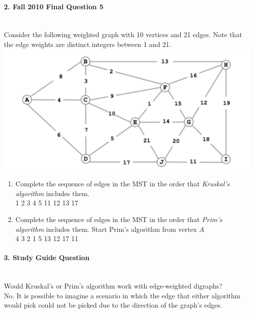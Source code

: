 \documentclass{article}
\begin{document}
\paragraph{\Large 2. Fall 2010 Final Question 5}\mbox{}\\
Consider the following weighted graph with 10 vertices and 21 edges. Note that the edge weights are distinct integers between 1 and 21.\\
\includegraphics[]{fin-f08-2.png}\\
\begin{enumerate}
\renewcommand{\theenumi}{\Alph{enumi}}
	\item Complete the sequence of edges in the MST in the order that \textit{Kruskal's algorithm} includes them.\\

	1 2 3 4 5 11 12 13 17

	\item Complete the sequence of edges in the MST in the order that \textit{Prim's algorithm} includes them. Start Prim's algorithm from vertex $A$\\

	4 3 2 1 5 13 12 17 11
\end{enumerate}

\paragraph{\Large 3. Study Guide Question}\mbox{}\\
Would Kruskal's or Prim's algorithm work with edge-weighted digraphs?\\

No. It is possible to imagine a scenario in which the edge that either algorithm would pick could not be picked due to the direction of the graph's edges.
\end{document}
